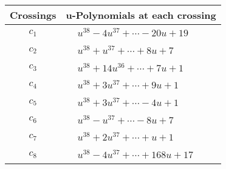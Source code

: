 \documentclass[1p]{elsarticle_modified}
\theoremstyle{definition}
\begin{document}
\begin{tabular}{m{50pt}|m{274pt}}
Crossings & \hspace{64pt}u-Polynomials at each crossing \\
\hline $$\begin{aligned}c_{1}\end{aligned}$$&$\begin{aligned}
&u^{38}-4 u^{37}+\cdots-20 u+19
\end{aligned}$\\
\hline $$\begin{aligned}c_{2}\end{aligned}$$&$\begin{aligned}
&u^{38}+u^{37}+\cdots+8 u+7
\end{aligned}$\\
\hline $$\begin{aligned}c_{3}\end{aligned}$$&$\begin{aligned}
&u^{38}+14 u^{36}+\cdots+7 u+1
\end{aligned}$\\
\hline $$\begin{aligned}c_{4}\end{aligned}$$&$\begin{aligned}
&u^{38}+3 u^{37}+\cdots+9 u+1
\end{aligned}$\\
\hline $$\begin{aligned}c_{5}\end{aligned}$$&$\begin{aligned}
&u^{38}+3 u^{37}+\cdots-4 u+1
\end{aligned}$\\
\hline $$\begin{aligned}c_{6}\end{aligned}$$&$\begin{aligned}
&u^{38}- u^{37}+\cdots-8 u+7
\end{aligned}$\\
\hline $$\begin{aligned}c_{7}\end{aligned}$$&$\begin{aligned}
&u^{38}+2 u^{37}+\cdots+u+1
\end{aligned}$\\
\hline $$\begin{aligned}c_{8}\end{aligned}$$&$\begin{aligned}
&u^{38}-4 u^{37}+\cdots+168 u+17
\end{aligned}$\\

\end{tabular}
\end{document}
